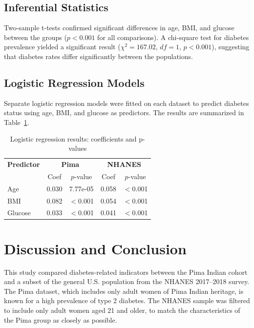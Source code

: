 \documentclass[12pt]{article}
\begin{document}
\subsection{Inferential Statistics}
Two-sample t-tests confirmed significant differences in age, BMI, and glucose between the groups ($p < 0.001$ for all comparisons). A chi-square test for diabetes prevalence yielded a significant result ($\chi^2 = 167.02$, $df = 1$, $p < 0.001$), suggesting that diabetes rates differ significantly between the populations.

\subsection{Logistic Regression Models}
Separate logistic regression models were fitted on each dataset to predict diabetes status using age, BMI, and glucose as predictors. The results are summarized in Table~\ref{tab:logreg}.

\begin{table}[H]
\centering
\caption{Logistic regression results: coefficients and p-values}
\label{tab:logreg}
\begin{tabular}{lcccc}
\toprule
\textbf{Predictor} & \multicolumn{2}{c}{\textbf{Pima}} & \multicolumn{2}{c}{\textbf{NHANES}} \\
\cmidrule(lr){2-3} \cmidrule(lr){4-5}
& Coef & $p$-value & Coef & $p$-value \\
\midrule
Age       & 0.030 & 7.77e-05 & 0.058 & $<$0.001 \\
BMI       & 0.082 & $<$0.001 & 0.054 & $<$0.001 \\
Glucose   & 0.033 & $<$0.001 & 0.041 & $<$0.001 \\
\bottomrule
\end{tabular}
\end{table}


\section{Discussion and Conclusion}

This study compared diabetes-related indicators between the Pima Indian cohort and a subset of the general U.S. population from the NHANES 2017–2018 survey. The Pima dataset, which includes only adult women of Pima Indian heritage, is known for a high prevalence of type 2 diabetes. The NHANES sample was filtered to include only adult women aged 21 and older, to match the characteristics of the Pima group as closely as possible.
\end{document}

